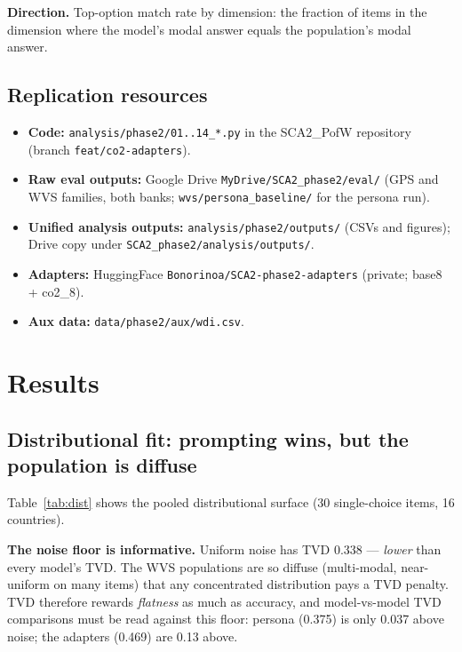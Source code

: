 \documentclass[11pt]{article}
\begin{document}
\textbf{Direction.} Top-option match rate by dimension: the fraction of items in the dimension where the model's modal answer equals the population's modal answer.

\subsection{Replication resources}
\label{sec:replication}
\begin{itemize}
\item \textbf{Code:} \texttt{analysis/phase2/01..14\_*.py} in the SCA2\_PofW repository (branch \texttt{feat/co2-adapters}).
\item \textbf{Raw eval outputs:} Google Drive \texttt{MyDrive/SCA2\_phase2/eval/} (GPS and WVS families, both banks; \texttt{wvs/persona\_baseline/} for the persona run).
\item \textbf{Unified analysis outputs:} \texttt{analysis/phase2/outputs/} (CSVs and figures); Drive copy under \texttt{SCA2\_phase2/analysis/outputs/}.
\item \textbf{Adapters:} HuggingFace \texttt{Bonorinoa/SCA2-phase2-adapters} (private; base8 + co2\_8).
\item \textbf{Aux data:} \texttt{data/phase2/aux/wdi.csv}.
\end{itemize}

\section{Results}\label{sec:results}

\subsection{Distributional fit: prompting wins, but the population is diffuse}
\label{sec:dist}
Table~\ref{tab:dist} shows the pooled distributional surface (30 single-choice items, 16 countries).

\begin{table}[ht]
\centering
\caption{Distributional surface, pooled across 16 countries and 30 single-choice items. Lower TVD/JSD and smaller |Entropy err|, |Std err| are better; top-match is a rate. All numbers are means over item$\times$country cells.}
\label{tab:dist}

\end{table}

\textbf{The noise floor is informative.} Uniform noise has TVD 0.338 --- \emph{lower} than every model's TVD. The WVS populations are so diffuse (multi-modal, near-uniform on many items) that any concentrated distribution pays a TVD penalty. TVD therefore rewards \emph{flatness} as much as accuracy, and model-vs-model TVD comparisons must be read against this floor: persona (0.375) is only 0.037 above noise; the adapters (0.469) are 0.13 above.
\end{document}
